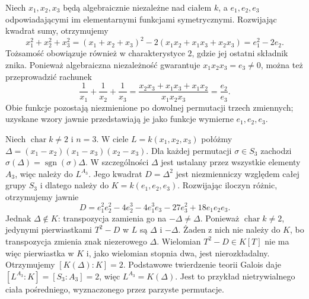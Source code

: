 \begin{przyklad}
\label{aa:prz:generic-rational-invariants}
Niech $x_1,x_2,x_3$ będą algebraicznie niezależne nad ciałem
$k$, a $e_1,e_2,e_3$ odpowiadającymi im elementarnymi
funkcjami symetrycznymi. Rozwijając kwadrat sumy, otrzymujemy
\[
 x_1^2+x_2^2+x_3^2=(x_1+x_2+x_3)^2
 -2(x_1x_2+x_1x_3+x_2x_3)=e_1^2-2e_2.
\]
Tożsamość obowiązuje również w charakterystyce $2$,
gdzie jej ostatni składnik znika. Ponieważ algebraiczna
niezależność gwarantuje $x_1x_2x_3=e_3\ne0$, można też
przeprowadzić rachunek
\[
 \frac1{x_1}+\frac1{x_2}+\frac1{x_3}
 =\frac{x_2x_3+x_1x_3+x_1x_2}{x_1x_2x_3}
 =\frac{e_2}{e_3}.
\]
Obie funkcje pozostają niezmienione po dowolnej permutacji
trzech zmiennych; uzyskane wzory jawnie przedstawiają je
jako funkcje wymierne $e_1,e_2,e_3$.
\end{przyklad}

\begin{przyklad}
\label{aa:prz:generic-discriminant}
Niech $\operatorname{char}k\ne2$ i $n=3$.
W ciele $L=k(x_1,x_2,x_3)$ połóżmy
$\Delta=(x_1-x_2)(x_1-x_3)(x_2-x_3)$.
Dla każdej permutacji $\sigma\in S_3$ zachodzi
$\sigma(\Delta)=\operatorname{sgn}(\sigma)\Delta$.
W szczególności $\Delta$ jest ustalany przez wszystkie
elementy $A_3$, więc należy do $L^{A_3}$.
Jego kwadrat $D=\Delta^2$ jest niezmienniczy względem
całej grupy $S_3$ i dlatego należy do
$K=k(e_1,e_2,e_3)$. Rozwijając iloczyn różnic,
otrzymujemy jawnie
\[
 D=e_1^2e_2^2-4e_2^3-4e_1^3e_3-27e_3^2+18e_1e_2e_3.
\]
Jednak $\Delta\notin K$:
transpozycja zamienia go na $-\Delta\ne\Delta$.
Ponieważ $\operatorname{char}k\ne2$, jedynymi pierwiastkami
$T^2-D$ w $L$ są $\Delta$ i $-\Delta$.
Żaden z nich nie należy do $K$, bo transpozycja zmienia
znak niezerowego $\Delta$. Wielomian $T^2-D\in K[T]$
nie ma więc pierwiastka w $K$ i, jako wielomian stopnia dwa,
jest nierozkładalny.
Otrzymujemy $[K(\Delta):K]=2$. Podstawowe twierdzenie
teorii Galois daje $[L^{A_3}:K]=[S_3:A_3]=2$, więc
$L^{A_3}=K(\Delta)$. Jest to przykład nietrywialnego
ciała pośredniego, wyznaczonego przez parzyste permutacje.
\end{przyklad}

